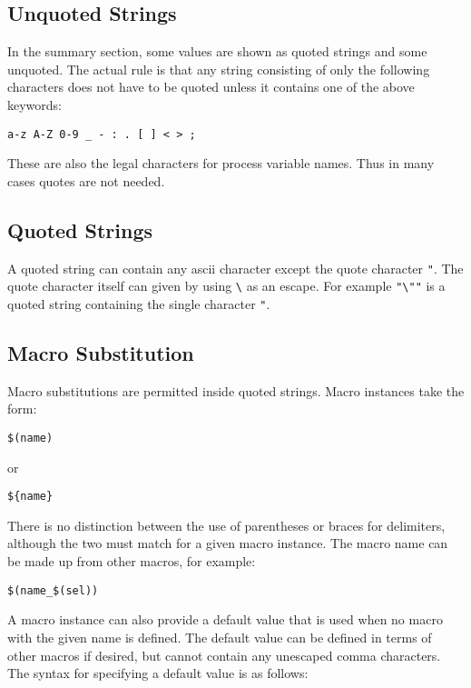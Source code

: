 \subsection{Unquoted Strings}

In the summary section, some values are shown as quoted strings and some unquoted. The actual rule is that any string 
consisting of only the following characters does not have to be quoted unless it contains one of the above keywords:

\begin{verbatim}
a-z A-Z 0-9 _ - : . [ ] < > ;
\end{verbatim}

These are also the legal characters for process variable names. Thus in many cases quotes are not needed.

\subsection{Quoted Strings}

A quoted string can contain any ascii character except the quote character \verb|"|. The quote character itself can given by using \verb|\| as an escape. For example \verb|"\""| is a quoted string containing the single character \verb|"|.

\subsection{Macro Substitution}

Macro substitutions are permitted inside quoted strings. Macro instances take the form:

\begin{verbatim}
$(name)
\end{verbatim}

or

\begin{verbatim}
${name}
\end{verbatim}

There is no distinction between the use of parentheses or braces for delimiters, although the two must match for a given 
macro instance. The macro name can be made up from other macros, for example:

\begin{verbatim}
$(name_$(sel))
\end{verbatim}

A macro instance can also provide a default value that is used when no macro with the given name is defined. The default 
value can be defined in terms of other macros if desired, but cannot contain any unescaped comma characters. The syntax 
for specifying a default value is as follows:

